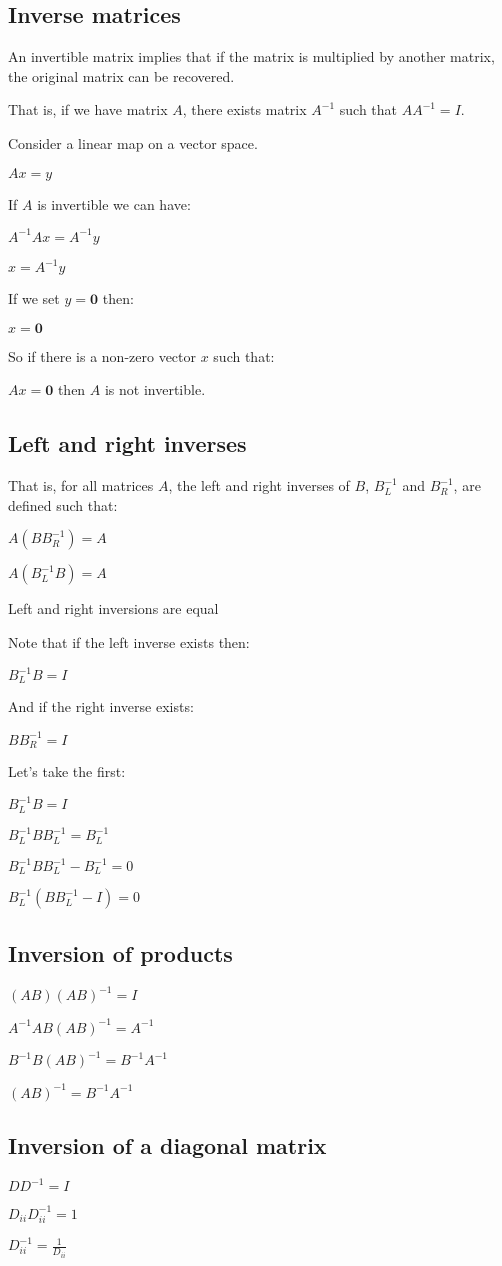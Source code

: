 
\subsection{Inverse matrices}

An invertible matrix implies that if the matrix is multiplied by another matrix, the original matrix can be recovered.

That is, if we have matrix \(A\), there exists matrix \(A^{-1}\) such that \(AA^{-1}=I\).

Consider a linear map on a vector space.

$Ax=y$

If \(A\) is invertible we can have:

$A^{-1}Ax=A^{-1}y$

$x=A^{-1}y$

If we set \(y=\mathbf 0\) then:

\(x=\mathbf 0\)

So if there is a non-zero vector \(x\) such that:

\(Ax=\mathbf 0\) then \(A\) is not invertible.

\subsection{Left and right inverses}

That is, for all matrices \(A\), the left and right inverses of \(B\), \(B_L^{-1}\) and \(B_R^{-1}\), are defined such that:

$A(BB_R^{-1})=A$

$A(B_L^{-1}B)=A$

Left and right inversions are equal

Note that if the left inverse exists then:

$B_L^{-1}B=I$

And if the right inverse exists:

$BB_R^{-1}=I$

Let’s take the first:

$B_L^{-1}B=I$

$B_L^{-1}BB_L^{-1}=B_L^{-1}$

$B_L^{-1}BB_L^{-1}-B_L^{-1}=0$

$B_L^{-1}(BB_L^{-1}-I)=0$

\subsection{Inversion of products}

\((AB)(AB)^{-1}=I\)

\(A^{-1}AB(AB)^{-1}=A^{-1}\)

\(B^{-1}B(AB)^{-1}=B^{-1}A^{-1}\)

\((AB)^{-1}=B^{-1}A^{-1}\)

\subsection{Inversion of a diagonal matrix}

$DD^{-1}=I$

$D_{ii}D_{ii}^{-1}=1$

$D_{ii}^{-1}=\frac{1}{D_{ii}}$


